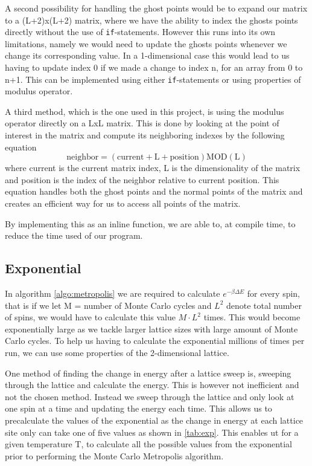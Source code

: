 \documentclass[%
reprint,
nofootinbib,
amsmath,amssymb,
aps,
]{revtex4-1}
\begin{document}
A second possibility for handling the ghost points would be to expand our matrix to a (L+2)x(L+2) matrix, where we have the ability to index the ghosts points directly without the use of \texttt{if}-statements. However this runs into its own limitations, namely we would need to update the ghosts points whenever we change its corresponding value. In a 1-dimensional case this would lead to us having to update index 0 if we made a change to index n, for an array from 0 to n+1. This can be implemented using either \texttt{if}-statements or using properties of modulus operator. 

A third method, which is the one used in this project, is using the modulus operator directly on a LxL matrix. This is done by looking at the point of interest in the matrix and compute its neighboring indexes by the following equation
\begin{equation}
	\text{neighbor} = (\text{current} + \text{L} + \text{position}) \text{MOD} (\text{L})
\end{equation}
where current is the current matrix index, L is the dimensionality of the matrix and position is the index of the neighbor relative to current position. 
This equation handles both the ghost points and the normal points of the matrix and creates an efficient way for us to access all points of the matrix. 

By implementing this as an inline function, we are able to, at compile time, to reduce the time used of our program. 

\subsection{Exponential}  %
In algorithm \ref{algo:metropolis} we are required to calculate $e^{-\beta\Delta E}$ for every spin, that is if we let M = number of Monte Carlo cycles and $L^2$ denote total number of spins, we would have to calculate this value $M\cdot L^2$ times. This would become exponentially large as we tackle larger lattice sizes with large amount of Monte Carlo cycles. To help us having to calculate the exponential millions of times per run, we can use some properties of the 2-dimensional lattice. 

One method of finding the change in energy after a lattice sweep is, sweeping through the lattice and calculate the energy. This is however not inefficient and not the chosen method. Instead we sweep through the lattice and only look at one spin at a time and updating the energy each time. This allows us to precalculate the values of the exponential as the change in energy at each lattice site only can take one of five values as shown in \autoref{tab:exp}. This enables ut for a given temperature T, to calculate all the possible values from the exponential prior to performing the Monte Carlo Metropolis algorithm. 
\end{document}
